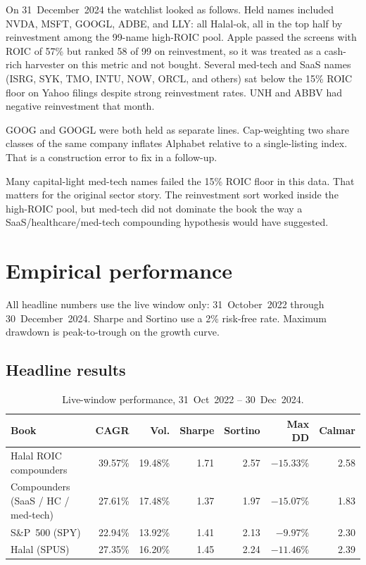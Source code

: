 \documentclass[11pt,letterpaper]{article}
\begin{document}
On 31~December~2024 the watchlist looked as follows. Held names included NVDA, MSFT, GOOGL, ADBE, and LLY: all Halal-ok, all in the top half by reinvestment among the 99-name high-ROIC pool. Apple passed the screens with ROIC of 57\% but ranked 58 of 99 on reinvestment, so it was treated as a cash-rich harvester on this metric and not bought. Several med-tech and SaaS names (ISRG, SYK, TMO, INTU, NOW, ORCL, and others) sat below the 15\% ROIC floor on Yahoo filings despite strong reinvestment rates. UNH and ABBV had negative reinvestment that month.

GOOG and GOOGL were both held as separate lines. Cap-weighting two share classes of the same company inflates Alphabet relative to a single-listing index. That is a construction error to fix in a follow-up.

Many capital-light med-tech names failed the 15\% ROIC floor in this data. That matters for the original sector story. The reinvestment sort worked inside the high-ROIC pool, but med-tech did not dominate the book the way a SaaS/healthcare/med-tech compounding hypothesis would have suggested.

\section{Empirical performance}
\label{sec:results}

All headline numbers use the live window only: 31~October~2022 through 30~December~2024. Sharpe and Sortino use a 2\% risk-free rate. Maximum drawdown is peak-to-trough on the growth curve.

\subsection{Headline results}

\begin{table}[htbp]
\centering
\caption{Live-window performance, 31~Oct~2022 -- 30~Dec~2024.}
\label{tab:perf}
\small
\begin{tabular}{lrrrrrr}
\toprule
Book & CAGR & Vol. & Sharpe & Sortino & Max DD & Calmar \\
\midrule
Halal ROIC compounders                    & 39.57\% & 19.48\% & 1.71 & 2.57 & $-15.33\%$ & 2.58 \\
Compounders (SaaS / HC / med-tech)        & 27.61\% & 17.48\% & 1.37 & 1.97 & $-15.07\%$ & 1.83 \\
S\&P~500 (SPY)                            & 22.94\% & 13.92\% & 1.41 & 2.13 & $-9.97\%$  & 2.30 \\
Halal (SPUS)                              & 27.35\% & 16.20\% & 1.45 & 2.24 & $-11.46\%$ & 2.39 \\
\bottomrule
\end{tabular}
\end{table}
\end{document}
